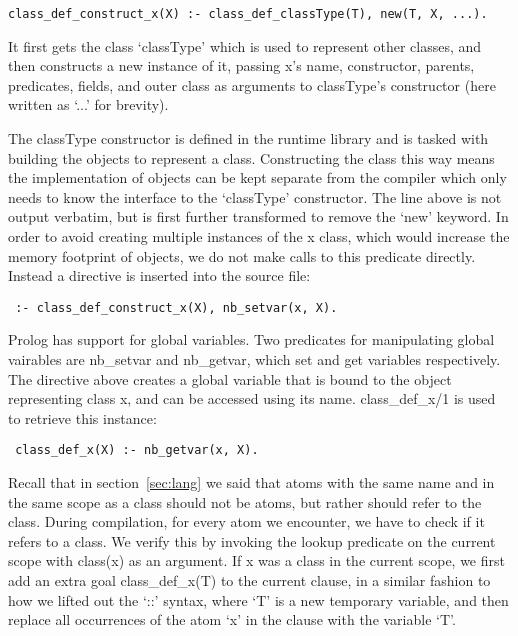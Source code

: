\documentclass[12pt,a4paper,twoside,openright]{report}
\begin{document}
\begin{lstlisting}
class_def_construct_x(X) :- class_def_classType(T), new(T, X, ...).
\end{lstlisting}

\noindent It first gets the class `classType' which is used to represent other classes, and then constructs a new instance of it, passing x's name, constructor, parents, predicates, fields, and outer class as arguments to classType's constructor (here written as `...' for brevity).

\bigskip

The classType constructor is defined in the runtime library and is tasked with building the objects to represent a class. Constructing the class this way means the implementation of objects can be kept separate from the compiler which only needs to know the interface to the `classType' constructor. The line above is not output verbatim, but is first further transformed to remove the `new' keyword. In order to avoid creating multiple instances of the x class, which would increase the memory footprint of objects, we do not make calls to this predicate directly. Instead a directive is inserted into the source file:

\begin{lstlisting}
 :- class_def_construct_x(X), nb_setvar(x, X).
\end{lstlisting}
 
   
\noindent Prolog has support for global variables. Two predicates for manipulating global vairables are nb_setvar and nb_getvar, which set and get variables respectively. The directive above creates a global variable that is bound to the object representing class x, and can be accessed using its name. class_def_x/1 is used to retrieve this instance:

\begin{lstlisting}
 class_def_x(X) :- nb_getvar(x, X).
\end{lstlisting}
 
\noindent Recall that in section~\ref{sec:lang} we said that atoms with the same name and in the same scope as a class should not be atoms, but rather should refer to the class. During compilation, for every atom we encounter, we have to check if it refers to a class. We verify this by invoking the lookup predicate on the current scope with class(x) as an argument. If x was a class in the current scope, we first add an extra goal class_def_x(T) to the current clause, in a similar fashion to how we lifted out the `::' syntax, where `T' is a new temporary variable, and then replace all occurrences of the atom `x' in the clause with the variable `T'.
\end{document}
